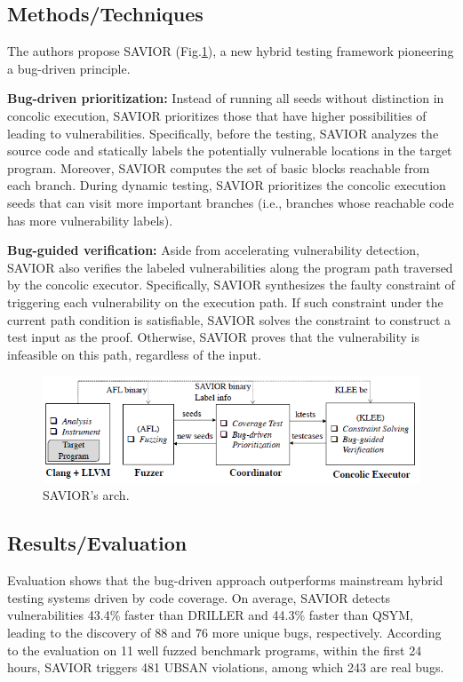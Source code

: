 \subsection{Methods/Techniques}
The authors propose SAVIOR (Fig.\ref{fig:savior}), a new hybrid testing framework pioneering a bug-driven principle.

\textbf{Bug-driven prioritization:} Instead of running all seeds without distinction in concolic execution, SAVIOR prioritizes those that have higher possibilities of leading to vulnerabilities.  Specifically, before the testing, SAVIOR analyzes the source code and {statically labels the potentially vulnerable locations} in the target program.  Moreover, SAVIOR computes the set of basic blocks reachable from each branch. During dynamic testing, SAVIOR {prioritizes the concolic execution seeds that can visit more important branches} (i.e., branches whose reachable code has more vulnerability labels).  

\textbf{Bug-guided verification: }Aside from accelerating vulnerability detection, SAVIOR also verifies the labeled vulnerabilities along the program path traversed by the concolic executor.  Specifically, SAVIOR synthesizes the faulty constraint of triggering each vulnerability on the execution path. If such constraint under the current path condition is satisfiable, SAVIOR solves the constraint to construct a test input as the proof. Otherwise, SAVIOR proves that the vulnerability is infeasible on this path, regardless of the input.

\begin{figure}[h]
    \centering
    \includegraphics[width=\linewidth]{savior.png} %
    \caption{SAVIOR's arch.}	
    \label{fig:savior}
\end{figure}


\subsection{Results/Evaluation %
}
Evaluation shows that the bug-driven approach outperforms mainstream hybrid testing systems driven by code coverage. On average, SAVIOR detects vulnerabilities 43.4\% faster than DRILLER and 44.3\% faster than QSYM, leading to the discovery of 88 and 76 more unique bugs, respectively. According to the {evaluation on 11 well fuzzed benchmark programs, within the first 24 hours, SAVIOR triggers 481 UBSAN violations, among which 243 are real bugs.} 
